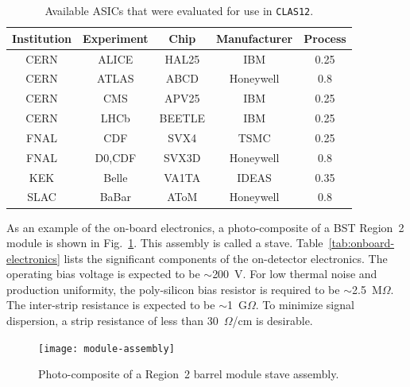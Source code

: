 \begin{table}[htbp]
\begin{center}
\begin{tabular}{|c|c|c|c|c|} \hline
Institution & Experiment & Chip & Manufacturer & Process \\ \hline
CERN & ALICE  & HAL25  & IBM       & 0.25 \\ \hline
CERN & ATLAS  & ABCD   & Honeywell & 0.8  \\ \hline
CERN & CMS    & APV25  & IBM       & 0.25 \\ \hline
CERN & LHCb   & BEETLE & IBM       & 0.25 \\ \hline
FNAL & CDF    & SVX4   & TSMC      & 0.25 \\ \hline
FNAL & D0,CDF & SVX3D  & Honeywell & 0.8  \\ \hline
KEK  & Belle  & VA1TA  & IDEAS     & 0.35 \\ \hline
SLAC & BaBar  & AToM   & Honeywell & 0.8  \\ \hline
\end{tabular}
\end{center}
\caption{\small{Available ASICs that were evaluated for use in {\tt CLAS12}.}}
\label{tab:chips}
\end{table}

As an example of the on-board electronics, a photo-composite of a BST Region~2 
module is shown in Fig.~\ref{fig:module-assembly}.  This assembly is called 
a stave.  Table~\ref{tab:onboard-electronics} lists the significant components 
of the on-detector electronics.  The operating bias voltage is expected to be 
$\sim$200~V.  For low thermal noise and production uniformity, the 
poly-silicon bias resistor is required to be $\sim$2.5~M$\Omega$.  The 
inter-strip resistance is expected to be $\sim$1~G$\Omega$.  To minimize 
signal dispersion, a strip resistance of less than 30~$\Omega$/cm is desirable.

\begin{figure}[htbp]
\centering
\texttt{[image: module-assembly]}
\caption{\small{Photo-composite of a Region~2 barrel module stave assembly.}}
\label{fig:module-assembly}
\end{figure}

